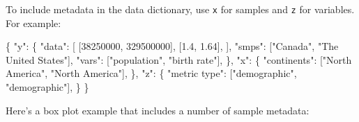 \documentclass[
  letterpaper,
  DIV=11,
  numbers=noendperiod]{scrartcl}
\newenvironment{Shaded}{\begin{snugshade}}{\end{snugshade}}
\newcommand{\DecValTok}[1]{\textcolor[rgb]{0.68,0.00,0.00}{#1}}
\newcommand{\FloatTok}[1]{\textcolor[rgb]{0.68,0.00,0.00}{#1}}
\newcommand{\NormalTok}[1]{\textcolor[rgb]{0.00,0.23,0.31}{#1}}
\newcommand{\StringTok}[1]{\textcolor[rgb]{0.13,0.47,0.30}{#1}}
\begin{document}
To include metadata in the data dictionary, use \texttt{x} for samples
and \texttt{z} for variables. For example:

\begin{Shaded}
\begin{Highlighting}[]
\NormalTok{\{}
    \StringTok{"y"}\NormalTok{: \{}
        \StringTok{"data"}\NormalTok{: [}
\NormalTok{            [}\DecValTok{38250000}\NormalTok{, }\DecValTok{329500000}\NormalTok{],}
\NormalTok{            [}\FloatTok{1.4}\NormalTok{, }\FloatTok{1.64}\NormalTok{],}
\NormalTok{        ],}
        \StringTok{"smps"}\NormalTok{: [}\StringTok{"Canada"}\NormalTok{, }\StringTok{"The United States"}\NormalTok{],}
        \StringTok{"vars"}\NormalTok{: [}\StringTok{"population"}\NormalTok{, }\StringTok{"birth rate"}\NormalTok{],}
\NormalTok{    \},}
    \StringTok{"x"}\NormalTok{: \{}
        \StringTok{"continents"}\NormalTok{: [}\StringTok{"North America"}\NormalTok{, }\StringTok{"North America"}\NormalTok{],}
\NormalTok{    \},}
    \StringTok{"z"}\NormalTok{: \{}
        \StringTok{"metric type"}\NormalTok{: [}\StringTok{"demographic"}\NormalTok{, }\StringTok{"demographic"}\NormalTok{],}
\NormalTok{    \}}
\NormalTok{\}}
\end{Highlighting}
\end{Shaded}

Here's a box plot example that includes a number of sample metadata:
\end{document}
